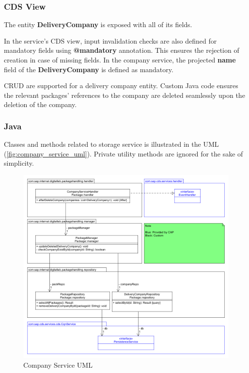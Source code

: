 \subsubsection{CDS View}

The entity \textbf{DeliveryCompany} is exposed with all of its fields.

\bigskip
In the service's CDS view, input invalidation checks are also defined for mandatory fields using \textbf{@mandatory} annotation. This ensures the rejection of creation in case of missing fields. In the company service, the projected \textbf{name} field of the \textbf{DeliveryCompany} is defined as mandatory.

\bigskip
CRUD are supported for a delivery company entity. Custom Java code ensures the relevant packages' references to the company are deleted seamlessly upon the deletion of the company.

\subsubsection{Java}

Classes and methods related to storage service is illustrated in the UML (\autoref{fig:company_service_uml}). Private utility methods are ignored for the sake of simplicity.

\begin{figure}[H]
    \centering
    \includegraphics[width=1\linewidth]{images/service_class_diagrams/company_service_class_diagram.png}
    \caption{Company Service UML}
    \label{fig:company_service_uml}
\end{figure}
\pagebreak

